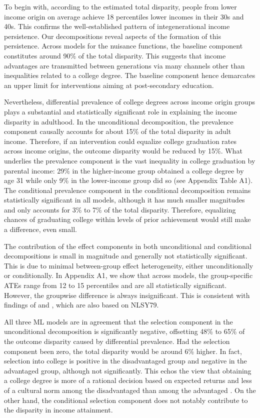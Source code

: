 \documentclass[12pt,a4paper]{article}
\begin{document}
To begin with, according to the estimated total disparity, people from lower income origin on average achieve 18 percentiles lower incomes in their 30s and 40s. This confirms the well-established pattern of integenerational income persistence. Our decompositions reveal aspects of the formation of this persistence. Across models for the nuisance functions, the baseline component constitutes around 90\% of the total disparity. This suggests that income advantages are transmitted between generations via many channels other than inequalities related to a college degree. The baseline component hence demarcates an upper limit for interventions aiming at  post-secondary education.

Nevertheless, differential prevalence of college degrees across income origin groups plays a substantial and statistically significant role in explaining the income disparity in adulthood. In the unconditional decomposition, the prevalence component causally accounts for about 15\% of the total disparity in adult income. Therefore, if an intervention could equalize college graduation rates across income origins, the outcome disparity would be reduced by 15\%. What underlies the prevalence component is the vast inequality in college graduation by parental income: 29\% in the higher-income group obtained a college degree by age 31 while only 9\% in the lower-income group did so (see Appendix Table A1). The conditional prevalence component in the conditional decomposition remains statistically significant in all models, although it has much smaller magnitudes and only accounts for 3\% to 7\% of the total disparity. Therefore, equalizing chances of graduating college within levels of prior achievement would still make a difference, even small.

The contribution of the effect components in both unconditional and conditional decompositions is small in magnitude and generally not statistically significant. This is due to minimal between-group effect heterogeneity, either unconditionally or conditionally. In Appendix A1, we show that across models, the group-specific ATEs range from 12 to 15 percentiles and are all statistically significant. However, the groupwise difference is always insignificant. This is consistent with findings of \citet{zhou_equalization_2019} and \citet{fiel_great_2020}, which are also based on NLSY79. 

All three ML models are in agreement that the selection component in the unconditional decomposition is significantly negative, offsetting 48\% to 65\% of the outcome disparity caused by differential prevalence. Had the selection component been zero, the total disparity would be around 6\% higher. In fact, selection into college is positive in the disadvantaged group and negative in the advantaged group, although not significantly. This echos the view that obtaining a college degree is more of a rational decision based on expected returns and less of a cultural norm among the disadvantaged than among the advantaged \citep{mare_social_1980, hout_social_2012}. On the other hand, the conditional selection component does not notably contribute to the disparity in income attainment. 
\end{document}
